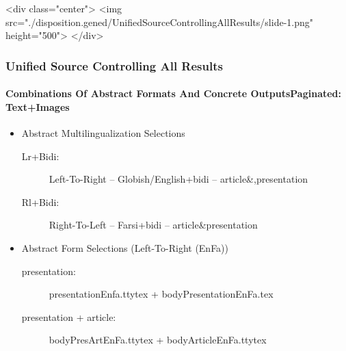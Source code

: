 \begin{whenOrg}
\begin{htmlonly}

\begin{frame}[fragile,plain,label=UnifiedSourceControllingAllResults]
    \frametitle{}
    \framesubtitle{}
    \begin{rawhtml}
<div class="center">
<img src="./disposition.gened/UnifiedSourceControllingAllResults/slide-1.png" height="500">
</div>
    \end{rawhtml}
\end{frame}
\end{htmlonly}

\begin{verblatex}

\begin{frame}[fragile,plain,label=UnifiedSourceControllingAllResults]
    \frametitle{Unified Source Controlling All Results}
    \framesubtitle{Combinations Of Abstract Formats And Concrete OutputsPaginated: Text+Images}


    \begin{itemize}
    \item Abstract Multilingualization Selections
      \begin{description}
      \item[Lr+Bidi:] Left-To-Right -- Globish/English+bidi -- article\&,presentation
      \item[Rl+Bidi:] Right-To-Left -- Farsi+bidi  -- article\&presentation
      \end{description}
    \end{itemize}

    \begin{itemize}
    \item Abstract Form Selections (Left-To-Right (EnFa))
      \begin{description}
      \item[presentation:] presentationEnfa.ttytex + bodyPresentationEnFa.tex
      \item[presentation + article:]  bodyPresArtEnFa.ttytex + bodyArticleEnFa.ttytex
      \end{description}
    \end{itemize}


\end{frame}
\end{verblatex}
\end{whenOrg}
